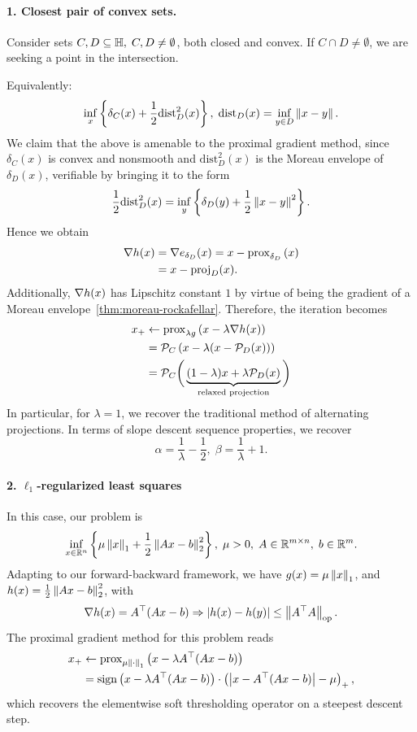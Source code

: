 \paragraph{1. Closest pair of convex sets.}
Consider sets $C, D \subseteq \mathbb{H}, \; C, D \neq \emptyset$, both closed and
convex. If $C \cap D \neq \emptyset$, we are seeking a point in the
intersection.

Equivalently:
\[
	\inf_{x} \left\{ \delta_C(x) + \frac{1}{2} \mathrm{dist}^2_D(x) \right\}, \;
	\mathrm{dist}_D(x) = \inf_{y \in D} \left \| x - y \right \|.
\]
We claim that the above is amenable to the proximal gradient method, since
$\delta_C(x)$ is convex and nonsmooth and $\mathrm{dist}^2_D(x)$ is the Moreau
envelope of $\delta_D(x)$, verifiable by bringing it to the form
\[
	\frac{1}{2} \mathrm{dist}^2_D(x) = \inf_{y} \left\{ \delta_D(y) + \frac{1}{2}
	\left \| x - y \right \|^2 \right\}.
\]
Hence we obtain
\begin{align*}
	\nabla h(x) &= \nabla e_{\delta_D}(x) = x - \mathrm{prox}_{\delta_D}\left( x \right) \\
		&= x - \mathrm{proj}_{D}(x).
\end{align*}
Additionally, $\nabla h(x)$ has Lipschitz constant $1$ by virtue of being the
gradient of a Moreau envelope~\cref{thm:moreau-rockafellar}. Therefore, the
iteration becomes
\begin{align}
	x_+ &\gets \mathrm{prox}_{\lambda g}\left( x - \lambda \nabla h(x) \right) \\
		&= \mathcal{P}_C \left( x - \lambda (x - \mathcal{P}_D(x)) \right) \\
		&= \mathcal{P}_C \bigg( \underbrace{(1 - \lambda) x + \lambda
		\mathcal{P}_D(x)}_{\text{relaxed projection}} \bigg)
\end{align}
In particular, for $\lambda = 1$, we recover the traditional method of
alternating projections. In terms of slope descent sequence properties,
we recover
\[
	\alpha = \frac{1}{\lambda} - \frac{1}{2}, \; \beta = \frac{1}{\lambda} + 1.
\]

\paragraph{2. $\ell_1$-regularized least squares}
In this case, our problem is
\[
	\inf_{x \in \mathbb{R}^n} \left\{ \mu \left \| x \right \|_1 + \frac{1}{2} \left \| Ax - b \right \|^2_2 \right\},
	\; \mu > 0, \; A \in \mathbb{R}^{m \times n}, \; b \in \mathbb{R}^m.
\]
Adapting to our forward-backward framework, we have $g(x) = \mu \left \| x \right \|_1$,
and $h(x) = \frac{1}{2} \left \| Ax - b \right \|_2^2$, with
\[
	\nabla h(x) = A^\top (Ax - b) \Rightarrow
	\left| h(x) - h(y) \right| \leq \left \|  A^\top A  \right \|_{\mathrm{op}}.
\]
The proximal gradient method for this problem reads
\begin{align*}
	x_+ &\gets \mathrm{prox}_{\mu \left \| \cdot \right \|_1}\left( x - \lambda A^\top (A x - b) \right) \\
		&= \mathrm{sign}\left(x - \lambda A^\top (A x - b)\right) \cdot
			\left( \left| x - A^\top (A x - b) \right| - \mu \right)_+,
\end{align*}
which recovers the elementwise soft thresholding operator on a steepest descent
step.
